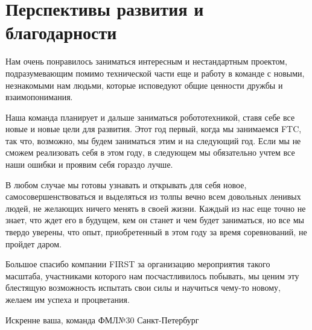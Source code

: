 
\section{Перспективы развития и благодарности}
    Нам очень понравилось заниматься интересным и нестандартным проектом, подразумевающим помимо технической части еще и работу в команде с новыми, незнакомыми нам людьми, которые исповедуют общие ценности дружбы и взаимопонимания.\newline
    
    Наша команда планирует и дальше заниматься робототехникой, ставя себе все новые и новые цели для развития. Этот год первый, когда мы занимаемся FTC, так что, возможно, мы будем заниматься этим и на следующий год. Если мы не сможем реализовать себя в этом году, в следующем мы обязательно учтем все наши ошибки и проявим себя гораздо лучше.\newline
    
    В любом случае мы готовы узнавать и открывать для себя новое, самосовершенствоваться и выделяться из толпы вечно всем довольных ленивых людей, не желающих ничего менять в своей жизни. Каждый из нас еще точно не знает, что ждет его в будущем, кем он станет и чем будет заниматься, но все мы твердо уверены, что опыт, приобретенный в этом году за время соревнований, не пройдет даром.\newline
    
    Большое спасибо компании FIRST за организацию мероприятия такого масштаба, участниками которого нам посчастливилось побывать, мы ценим эту блестящую возможность испытать свои силы и научиться чему-то новому, желаем им успеха и процветания.\newline
    
    \begin{center}
      Искренне ваша, команда ФМЛ№30 Санкт-Петербург
    \end{center}
\newpage
